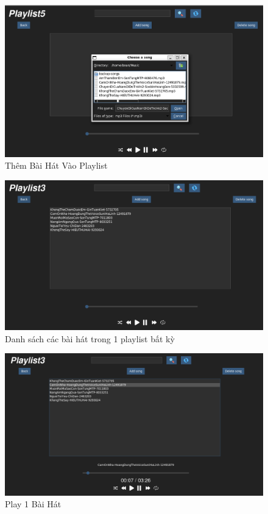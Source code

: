 \documentclass[a4paper]{article}
\begin{document}
\begin{figure}[H]
    \centering
    \includegraphics[width=1.0\textwidth]{addsongtoplaylist.PNG}
    \caption{Thêm Bài Hát Vào Playlist}
    \label{fig:example_image}
\end{figure}

\begin{figure}[H]
    \centering
    \includegraphics[width=1.0\textwidth]{songsinplaylist.PNG}
    \caption{Danh sách các bài hát trong 1 playlist bất kỳ}
    \label{fig:example_image}
\end{figure}

\begin{figure}[H]
    \centering
    \includegraphics[width=1.0\textwidth]{playsong.PNG}
    \caption{Play 1 Bài Hát}
    \label{fig:example_image}
\end{figure}
\end{document}
